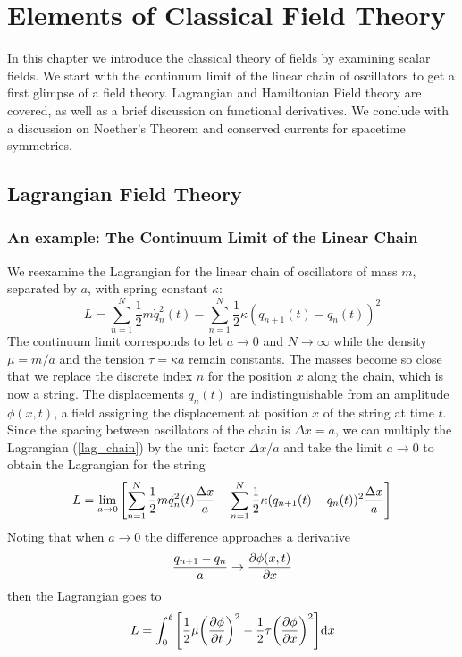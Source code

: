 \chapter{Elements of Classical Field Theory}
In this chapter we introduce the classical theory of fields by examining scalar fields. We start with the continuum limit of the linear chain of oscillators to get a first glimpse of a field theory. Lagrangian and Hamiltonian Field theory are covered, as well as a brief discussion on functional derivatives. We conclude with a discussion on Noether's Theorem and conserved currents for spacetime symmetries.


\section{Lagrangian Field Theory}
\subsection{An example: The Continuum Limit of the Linear Chain}
We reexamine the Lagrangian for the linear chain of oscillators of mass $m$, separated by $a$, with spring constant $\kappa$:
\begin{equation}
    L=\sum_{n=1}^N\frac{1}{2}m\dot{q}^2_n(t)- \sum_{n=1}^N\frac{1}{2}\kappa(q_{n+1}(t)-q_n(t))^2
    \label{lag_chain}
\end{equation}
The continuum limit corresponds to let $a\to0$ and $N\to\infty$ while the density $\mu=m/a$ and the tension $\tau =\kappa a$ remain constants. The masses become so close that we replace the discrete index $n$ for the position $x$ along the chain, which is now a string. The displacements $q_n(t)$ are indistinguishable from an amplitude $\phi(x,t)$, a field assigning the displacement at  position $x$ of the string at time $t$. Since the spacing between oscillators of the chain is $\Delta x = a$, we can multiply the Lagrangian (\ref{lag_chain}) by the unit factor $\Delta x/a$ and take the limit $a\to0$ to obtain the Lagrangian for the string
\begin{equation}
    L=\lim_{a\to0}\qty[\sum_{n=1}^N\frac{1}{2}m\dot{q}^2_n(t)\frac{\Delta x}{a}- \sum_{n=1}^N\frac{1}{2}\kappa(q_{n+1}(t)-q_n(t))^2\frac{\Delta x}{a}]
\end{equation}
Noting that when $a\to0$ the difference approaches a derivative
\begin{equation}
    \frac{q_{n+1}-q_n}{a}\to\pdv{\phi(x,t)}{x}
\end{equation}
then the Lagrangian goes to
\begin{equation}
    L=\int_0^\ell\qty[\frac{1}{2}\mu \qty(\pdv{\phi}{t})^2-\frac{1}{2}\tau\qty(\pdv{\phi}{x})^2]\dd x
    \label{lag_string}
\end{equation}
 
